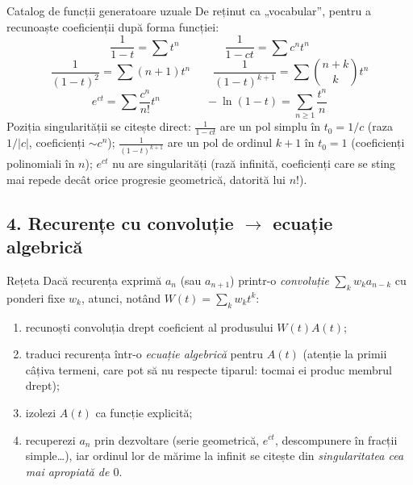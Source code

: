 \begin{tehbox}{Catalog de funcții generatoare uzuale}
De reținut ca „vocabular'', pentru a recunoaște coeficienții după forma funcției:
\[
\frac{1}{1-t}=\sum t^n\qquad\qquad \frac{1}{1-ct}=\sum c^nt^n
\]
\[
\frac{1}{(1-t)^2}=\sum(n+1)t^n\qquad \frac{1}{(1-t)^{k+1}}=\sum\binom{n+k}{k}t^n
\]
\[
e^{ct}=\sum\frac{c^n}{n!}t^n\qquad\qquad -\ln(1-t)=\sum_{n\ge1}\frac{t^n}{n}
\]
Poziția singularității se citește direct: $\frac{1}{1-ct}$ are un pol simplu în $t_0=1/c$ (raza $1/|c|$, coeficienți $\sim c^n$); $\frac{1}{(1-t)^{k+1}}$ are un pol de ordinul $k+1$ în $t_0=1$ (coeficienți polinomiali în $n$); $e^{ct}$ nu are singularități (rază infinită, coeficienți care se sting mai repede decât orice progresie geometrică, datorită lui $n!$).
\end{tehbox}

\subsection*{4. Recurențe cu convoluție $\to$ ecuație algebrică}

\begin{tehbox}{Rețeta}
Dacă recurența exprimă $a_n$ (sau $a_{n+1}$) printr-o \emph{convoluție} $\sum_k w_k a_{n-k}$ cu ponderi fixe $w_k$, atunci, notând $W(t)=\sum_k w_kt^k$:
\begin{enumerate}[leftmargin=*, itemsep=1pt]
\item recunoști convoluția drept coeficient al produsului $W(t)A(t)$;
\item traduci recurența într-o \emph{ecuație algebrică} pentru $A(t)$ (atenție la primii câțiva termeni, care pot să nu respecte tiparul: tocmai ei produc membrul drept);
\item izolezi $A(t)$ ca funcție explicită;
\item recuperezi $a_n$ prin dezvoltare (serie geometrică, $e^{ct}$, descompunere în fracții simple\ldots), iar ordinul lor de mărime la infinit se citește din \emph{singularitatea cea mai apropiată de $0$}.
\end{enumerate}
\end{tehbox}

